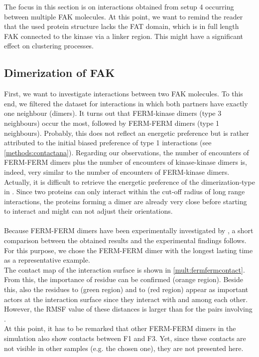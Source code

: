 \label{multiProt}
The focus in this section is on interactions obtained from setup 4 occurring between multiple FAK molecules. At this point, we want to remind the reader that the used protein structure lacks the FAT domain, which is in full length FAK connected to the kinase via a linker region. This might have a significant effect on clustering processes.
\subsection{Dimerization of FAK}
\label{mult:dimers}
First, we want to investigate interactions between two FAK molecules. To this end, we filtered the dataset for interactions in which both partners have exactly one neighbour (dimers). It turns out that FERM-kinase dimers (type 3 neighbours) occur the most, followed by FERM-FERM dimers (type 1 neighbours). Probably, this does not reflect an energetic preference but is rather attributed to the initial biased preference of type 1 interactions (see \autoref{methods:contactana}). Regarding our observations, the number of encounters of FERM-FERM dimers plus the number of encounters of kinase-kinase dimers is, indeed, very similar to the number of encounters of FERM-kinase dimers. Actually, it is difficult to retrieve the energetic preference of the dimerization-type in \martini{}. Since two proteins can only interact within the cut-off radius of long range interactions, the proteins forming a dimer are already very close before starting to interact and might can not adjust their orientations.\\
\\
Because FERM-FERM dimers have been experimentally investigated by \textcite{fakdimers}, a short comparison between the obtained results and the experimental findings follows. For this purpose, we chose the FERM-FERM dimer with the longest lasting time as a representative example.\\
The contact map of the interaction surface is shown in \autoref{mult:fermfermcontact}. From this, the importance of residue  can be confirmed (orange region). Beside this, also the residues  to  (green region) and  to  (red region) appear as important actors at the interaction surface since they interact with  and among each other. However, the RMSF value of these distances is larger than for the pairs involving .\\
At this point, it has to be remarked that other FERM-FERM dimers in the simulation also show contacts between F1 and F3. Yet, since these contacts are not visible in other samples (e.g. the chosen one), they are not presented here.\\
